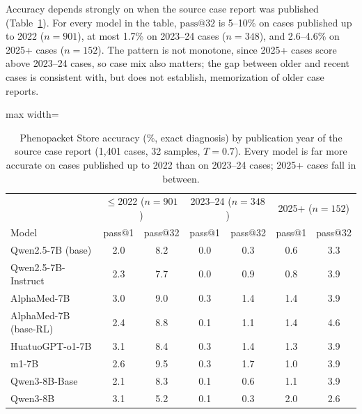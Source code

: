 \documentclass[wcp]{jmlr}
\makeatletter
\newcommand{\passk}[1]{\mathrm{pass@}#1}
\makeatother
\begin{document}
Accuracy depends strongly on when the source case report was published (Table~\ref{tab:era}). For every model in the table, $\passk{32}$ is 5--10\% on cases published up to 2022 ($n{=}901$), at most 1.7\% on 2023--24 cases ($n{=}348$), and 2.6--4.6\% on 2025+ cases ($n{=}152$). The pattern is not monotone, since 2025+ cases score above 2023--24 cases, so case mix also matters; the gap between older and recent cases is consistent with, but does not establish, memorization of older case reports.

\begin{table}[t]
\centering\small
\begin{adjustbox}{max width=\linewidth}
\begin{tabular}{lcccccc}
\toprule
 & \multicolumn{2}{c}{$\le$2022 ($n{=}901$)} & \multicolumn{2}{c}{2023--24 ($n{=}348$)} & \multicolumn{2}{c}{2025+ ($n{=}152$)} \\
Model & pass@1 & pass@32 & pass@1 & pass@32 & pass@1 & pass@32 \\
\midrule
Qwen2.5-7B (base) & 2.0 & 8.2 & 0.0 & 0.3 & 0.6 & 3.3 \\
Qwen2.5-7B-Instruct & 2.3 & 7.7 & 0.0 & 0.9 & 0.8 & 3.9 \\
AlphaMed-7B & 3.0 & 9.0 & 0.3 & 1.4 & 1.4 & 3.9 \\
AlphaMed-7B (base-RL) & 2.4 & 8.8 & 0.1 & 1.1 & 1.4 & 4.6 \\
HuatuoGPT-o1-7B & 3.1 & 8.4 & 0.3 & 1.4 & 1.3 & 3.9 \\
m1-7B & 2.6 & 9.5 & 0.3 & 1.7 & 1.0 & 3.9 \\
Qwen3-8B-Base & 2.1 & 8.3 & 0.1 & 0.6 & 1.1 & 3.9 \\
Qwen3-8B & 3.1 & 5.2 & 0.1 & 0.3 & 2.0 & 2.6 \\
\bottomrule
\end{tabular}
\end{adjustbox}
\caption{Phenopacket Store accuracy (\%, exact diagnosis) by publication year of the source case report (1,401 cases, 32 samples, $T{=}0.7$). Every model is far more accurate on cases published up to 2022 than on 2023--24 cases; 2025+ cases fall in between.}
\label{tab:era}
\end{table}
\end{document}
